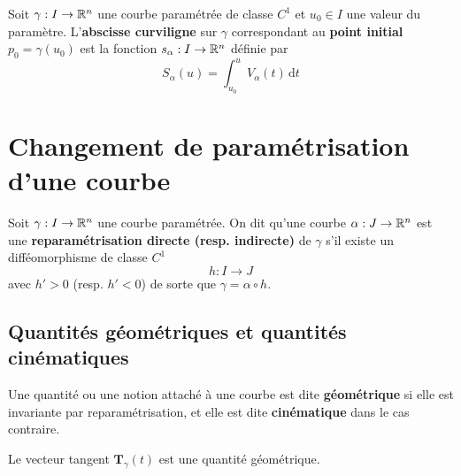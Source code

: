 \begin{definition}
	Soit $\gamma : I \to \mathbb{R}^n$ une courbe paramétrée de classe $C^1$ et $u_0 \in I$ une valeur du paramètre. L'\textbf{abscisse curviligne} sur $\gamma$ correspondant au \textbf{point initial} $p_0 = \gamma(u_0)$	est la fonction $s_\alpha : I \to \mathbb{R}^n$ définie par
	\[
	S_\alpha(u) = \int_{u_0}^u V_\alpha(t) \, \mathrm dt
	\]
\end{definition}


\section{Changement de paramétrisation d'une courbe}
\begin{definition}
	Soit $\gamma : I \to \mathbb{R}^n$ une courbe paramétrée. On dit qu'une courbe $\alpha : J \to \mathbb{R}^n$ est une \textbf{reparamétrisation directe (resp. indirecte)} de $\gamma$ s'il existe un difféomorphisme de classe $C^1$
	\[
	h : I \to J
	\]
	avec $h' > 0$ (resp. $h' < 0$) de sorte que $\gamma = \alpha \circ h$.
\end{definition}
\begin{figure}[H]
	\centering
\end{figure}

\subsection{Quantités géométriques et quantités cinématiques}
\begin{definition}
	Une quantité ou une notion attaché à une courbe est dite \textbf{géométrique} si elle est invariante par reparamétrisation, et elle est dite \textbf{cinématique} dans le cas contraire.
\end{definition}

\begin{lemme} \label{lem: vecteur tangent est invariant par reparamétrisation}
	Le vecteur tangent $\bm T_\gamma(t)$ est une quantité géométrique.
\end{lemme}


